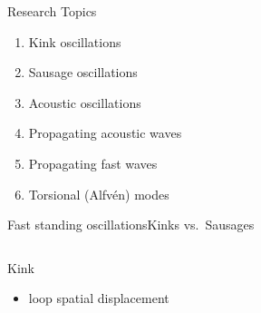 \documentclass[table]{beamer}
\begin{document}
\begin{frame}{Research Topics}
\begin{enumerate}
    \item Kink oscillations
    \item Sausage oscillations
    \item Acoustic oscillations
    \item Propagating acoustic waves
    \item Propagating fast waves
    \item Torsional (Alfv\'en) modes
\end{enumerate}
\end{frame}%
\begin{frame}{Fast standing oscillations}{Kinks vs.\ Sausages}
    \begin{columns}
    \begin{block}{Kink}
        \begin{itemize}
            \item loop spatial displacement

\end{itemize}
\end{block}
\end{columns}
\end{frame}
\end{document}
